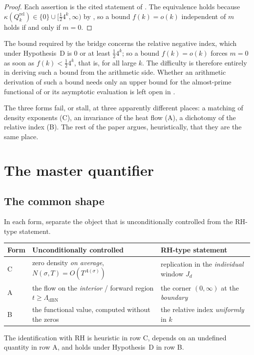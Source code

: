 \documentclass[11pt]{amsart}
\theoremstyle{definition}
\theoremstyle{remark}
\newcommand{\LDBN}{\Lambda_{\mathrm{dBN}}}
\begin{document}
\begin{proof}
Each assertion is the cited statement of \cite{P28}. The equivalence holds
because $\kappa(Q_k^{\mathrm{rel}})\in\{0\}\cup[\tfrac12 4^k,\infty)$ by
\cite[Thm~4.2 and \S6.1]{P28}, so a bound $f(k)=o(k)$ independent of $m$ holds if and
only if $m=0$.
\end{proof}

The bound required by the bridge concerns the relative negative index, which
under Hypothesis~D is $0$ or at least $\tfrac12 4^k$; so a bound $f(k)=o(k)$
forces $m=0$ as soon as $f(k)<\tfrac12 4^k$, that is, for all large $k$. The
difficulty is therefore entirely in deriving such a bound from the arithmetic
side. Whether an arithmetic derivation of such a bound needs only an upper
bound for the almost-prime functional of \cite[Thm~5.4]{P28} or its
asymptotic evaluation is left open in \cite[Remark~6.2]{P28}.

The three forms fail, or stall, at three apparently different places: a
matching of density exponents (C), an invariance of the heat flow (A), a
dichotomy of the relative index (B). The rest of the paper argues,
heuristically, that they are the same place.

\section{The master quantifier}\label{sec:master}

\subsection{The common shape}
In each form, separate the object that is unconditionally controlled from
the RH-type statement.

\begin{center}
\renewcommand{\arraystretch}{1.45}
\begin{tabular}{lp{5.5cm}p{5.5cm}}
\textbf{Form} & \textbf{Unconditionally controlled} & \textbf{RH-type statement}\\
\hline
C & zero density \emph{on average}, $N(\sigma,T)=O(T^{A(\sigma)})$ & replication in the \emph{individual} window $J_d$\\
A & the flow on the \emph{interior} / forward region $t\ge\LDBN$ & the corner $(0,\infty)$ at the \emph{boundary}\\
B & the functional value, computed without the zeros & the relative index \emph{uniformly} in $k$\\
\end{tabular}
\end{center}
The identification with RH is heuristic in row C, depends on an undefined
quantity in row A, and holds under Hypothesis~D in row B.
\end{document}
